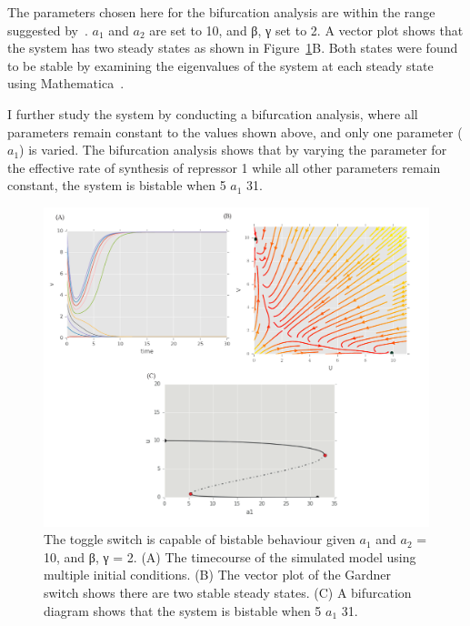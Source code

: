The parameters chosen here for the bifurcation analysis are within the range suggested by~\textcite{Gardner:2000vha}.  $a_1$ and $a_2$ are set to 10, and β, γ set to 2. A vector plot shows that the system has two steady states as shown in Figure~\ref{fig:Gard_CS}B. Both states were found to be stable by examining the eigenvalues of the system at each steady state using Mathematica~\autocite{mathematica:2016}.


I further study the system by conducting a bifurcation analysis, where all parameters remain constant to the values shown above, and only one parameter ($a_1$) is varied. The bifurcation analysis shows that by varying the parameter for the effective rate of synthesis of repressor 1 while all other parameters remain constant, the system is bistable when 5 \ge{} $a_1$ \le{} 31.



\begin{figure}[htbp]
\centerfloat
\includegraphics[scale=0.7]{../../chapters/chapterABCSysBio/images/Gard_CS.pdf}
\caption[Phase space and bifurcation analysis of the Gardner toggle switch]{\label{fig:Gard_CS}The \textcite{Gardner:2000vha} toggle switch is capable of bistable behaviour given $a_1$ and $a_2$ = 10, and β, γ = 2. (A) The timecourse of the simulated model using multiple initial conditions. (B) The vector plot of the Gardner switch shows there are two stable steady states. (C) A bifurcation diagram shows that the system is bistable when 5 \ge{} $a_1$ \le{} 31.}
\end{figure}
\clearpage




